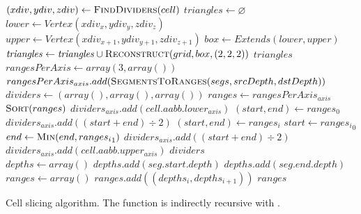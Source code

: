 \begin{algorithm}
	\centering
	\begin{algorithmic}[1]
			\State $(xdiv, ydiv, zdiv) \gets \Call{FindDividers}{cell}$
			\State $triangles \gets \varnothing$
				\State $lower \gets Vertex(xdiv_{x}, ydiv_{y}, zdiv_{z})$
				\State $upper \gets Vertex(xdiv_{x + 1}, ydiv_{y + 1}, zdiv_{z + 1})$
				\State $box \gets Extends(lower, upper)$
				\State $\var{triangles} \gets \var{triangles} \cup \Call{Reconstruct}{grid, box, (2, 2, 2)}$
			\EndFor
			\State \Return $triangles$
		\EndFunction
		\\
			\State $rangesPerAxis \gets array(3, array())$
					\State $rangesPerAxis_{axis}.add(\Call{SegmentsToRanges}{segs, srcDepth, dstDepth})$
				\EndIf
			\EndFor
			\State $dividers \gets (array(), array(), array())$
				\State $ranges \gets rangesPerAxis_{axis}$
				\State $\Call{Sort}{ranges}$ 
				\State $dividers_{axis}.add(cell.aabb.lower_{axis})$
				\State $(start, end) \gets ranges_0$
						\State $dividers_{axis}.add((start + end) \div 2)$
						\State $(start, end) \gets ranges_i$
					\Else
						\State $start \gets {ranges_i}_0$
						\State $end \gets \Call{Min}{end, {ranges_i}_1}$
					\EndIf
				\EndFor
				\State $dividers_{axis}.add((start + end) \div 2)$
				\State $dividers_{axis}.add(cell.aabb.upper_{axis})$
			\EndFor
			\State \Return $dividers$
		\EndFunction
		\\
			\State $depths \gets array()$
					\State $depths.add(seg.start.depth)$
				\EndIf
					\State $depths.add(seg.end.depth)$
				\EndIf
			\EndFor
			\State $ranges \gets array()$
				\State $ranges.add((depths_{i}, depths_{i + 1}))$
			\EndFor
			\State \Return $ranges$
		\EndFunction
	\end{algorithmic}
	\caption{
		Cell slicing algorithm.
		The  function is indirectly recursive with .
	}
	\label{alg:tri_dexel_cell_slicing}
\end{algorithm}
